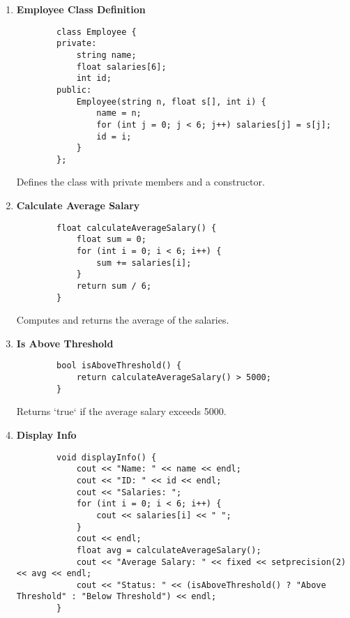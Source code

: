 \documentclass[a4paper,12pt]{article}
\begin{document}
\begin{enumerate}
    \item \textbf{Employee Class Definition}

    \lstset{language=C++}
    \begin{lstlisting}
        class Employee {
        private:
            string name;
            float salaries[6];
            int id;
        public:
            Employee(string n, float s[], int i) {
                name = n;
                for (int j = 0; j < 6; j++) salaries[j] = s[j];
                id = i;
            }
        };
    \end{lstlisting}

    Defines the class with private members and a constructor.

    \item \textbf{Calculate Average Salary}

    \lstset{language=C++}
    \begin{lstlisting}
        float calculateAverageSalary() {
            float sum = 0;
            for (int i = 0; i < 6; i++) {
                sum += salaries[i];
            }
            return sum / 6;
        }
    \end{lstlisting}

    Computes and returns the average of the salaries.

    \item \textbf{Is Above Threshold}

    \lstset{language=C++}
    \begin{lstlisting}
        bool isAboveThreshold() {
            return calculateAverageSalary() > 5000;
        }
    \end{lstlisting}

    Returns `true` if the average salary exceeds 5000.

    \item \textbf{Display Info}

    \lstset{language=C++}
    \begin{lstlisting}
        void displayInfo() {
            cout << "Name: " << name << endl;
            cout << "ID: " << id << endl;
            cout << "Salaries: ";
            for (int i = 0; i < 6; i++) {
                cout << salaries[i] << " ";
            }
            cout << endl;
            float avg = calculateAverageSalary();
            cout << "Average Salary: " << fixed << setprecision(2) << avg << endl;
            cout << "Status: " << (isAboveThreshold() ? "Above Threshold" : "Below Threshold") << endl;
        }
    \end{lstlisting}


\end{enumerate}
\end{document}
